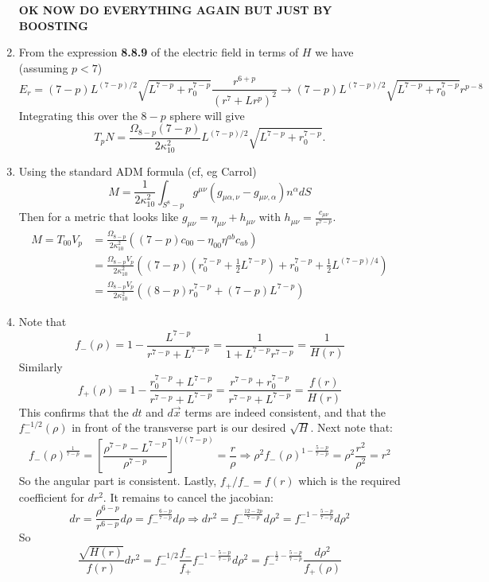 \documentclass[11pt, class=article, crop=false]{standalone}
\begin{document}
\begin{enumerate}
	
	\textbf{OK NOW DO EVERYTHING AGAIN BUT JUST BY BOOSTING}
	
	\item From the expression \textbf{8.8.9} of the electric field in terms of $H$ we have (assuming $p < 7$)
	\[
		E_r = (7-p) L^{(7-p)/2} \sqrt{L^{7-p} + r_0^{7-p}} \frac{r^{6+p}}{(r^{7} + L r^{p})^2} \to (7-p) L^{(7-p)/2} \sqrt{L^{7-p} + r_0^{7-p}} r^{p-8}
	\]
	Integrating this over the $8-p$ sphere will give
	\[
		T_p N = \frac{\Omega_{8-p} (7-p)}{2 \kappa_{10}^2} L^{(7-p)/2} \sqrt{L^{7-p} + r_0^{7-p}}.
	\]
	
	\item Using the standard ADM formula (cf, eg Carrol)
	\[
		M = \frac{1}{2 \kappa_{10}^2} \int_{S^8-p} g^{\mu \nu} (g_{\mu \alpha, \nu} - g_{\mu \nu, \alpha}) n^\alpha dS
	\]
	Then for a metric that looks like $g_{\mu \nu} = \eta_{\mu \nu} + h_{\mu \nu}$ with $h_{\mu \nu} = \frac{c_{\mu \nu}}{r^{7-p}}$.
	\[
	\begin{aligned}
		M = T_{00} V_p & = \frac{\Omega_{8-p}}{2 \kappa_{10}^2} ((7-p) c_{00} - \eta_{00} \eta^{ab} c_{ab} )\\
		& = \frac{\Omega_{8-p} V_p}{2 \kappa_{10}^2} ( (7-p) (r_0^{7-p} + \frac12 L^{7-p}) + r_0^{7-p} + \frac12 L^{(7-p)/4} )\\
		&= \frac{\Omega_{8-p} V_p}{2 \kappa_{10}^2} ((8-p) r_0^{7-p} + (7-p) L^{7-p} )
	\end{aligned}
	\]
	
	\item Note that
	\[
		f_-(\rho) = 1 - \frac{L^{7-p}}{r^{7-p} + L^{7-p}} = \frac{1}{1+ L^{7-p}{r^{7-p}}} = \frac1{H(r)}
	\]
	Similarly
	\[
		f_+(\rho) = 1 - \frac{r_0^{7-p} + L^{7-p}}{r^{7-p} + L^{7-p}} = \frac{r^{7-p} + r_0^{7-p}}{r^{7-p} + L^{7-p}} = \frac{f(r)}{H(r)}
	\]
	This confirms that the $dt$ and $d\vec x$ terms are indeed consistent, and that the $f^{-1/2}_-(\rho)$ in front of the transverse part is our desired $\sqrt{H}$. Next note that:
	\[
		f_-(\rho)^{\frac{1}{7-p}} = \left[\frac{\rho^{7-p} - L^{7-p}}{\rho^{7-p}} \right]^{1/(7-p)} = \frac{r}{\rho} \Rightarrow \rho^2 f_-(\rho)^{1-\frac{5-p}{7-p}} = \rho^2 \frac{r^2}{\rho^2} = r^2
	\]
	So the angular part is consistent. Lastly, $f_+/f_- = f(r)$ which is the required coefficient for $dr^2$. It remains to cancel the jacobian:
	\[
		dr  = \frac{\rho^{6-p}} {r^{6-p}} d\rho = f_-^{-\frac{6-p}{7-p}} d\rho \Rightarrow dr^2 = f_-^{-\frac{12-2p}{7-p}} d \rho^2 = f_-^{-1-\frac{5-p}{7-p}} d \rho^2
	\]
	So
	\[
		\frac{\sqrt{H(r)}}{f(r)} dr^2 = f_-^{-1/2} \frac{f_-}{f_+} f_-^{-1-\frac{5-p}{7-p}} d \rho^2 = f_-^{-\frac12 - \frac{5-p}{7-p}} \frac{d\rho^2}{f_+(\rho)}
	\]
	

\end{enumerate}
\end{document}
